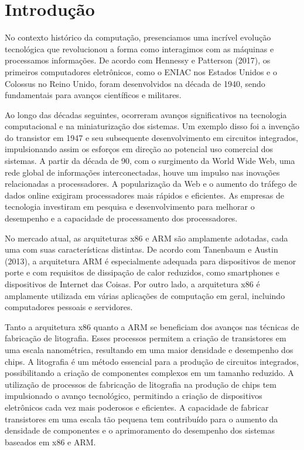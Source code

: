\section{Introdução}
\label{sec:introducao}

No contexto histórico da computação, presenciamos uma incrível evolução tecnológica que revolucionou a forma como interagimos com as máquinas e processamos informações. De acordo com Hennessy e Patterson (2017), os primeiros computadores eletrônicos, como o ENIAC nos Estados Unidos e o Colossus no Reino Unido, foram desenvolvidos na década de 1940, sendo fundamentais para avanços científicos e militares.

Ao longo das décadas seguintes, ocorreram avanços significativos na tecnologia computacional e na miniaturização dos sistemas. Um exemplo disso foi a invenção do transistor em 1947 e seu subsequente desenvolvimento em circuitos integrados, impulsionando assim os esforços em direção ao potencial uso comercial dos sistemas.
A partir da década de 90, com o surgimento da World Wide Web, uma rede global de informações interconectadas, houve um impulso nas inovações relacionadas a processadores. A popularização da Web e o aumento do tráfego de dados online exigiram processadores mais rápidos e eficientes. As empresas de tecnologia investiram em pesquisa e desenvolvimento para melhorar o desempenho e a capacidade de processamento dos processadores.

No mercado atual, as arquiteturas x86 e ARM são amplamente adotadas, cada uma com suas características distintas. De acordo com Tanenbaum e Austin (2013), a arquitetura ARM é especialmente adequada para dispositivos de menor porte e com requisitos de dissipação de calor reduzidos, como smartphones e dispositivos de Internet das Coisas. Por outro lado, a arquitetura x86 é amplamente utilizada em várias aplicações de computação em geral, incluindo computadores pessoais e servidores.

Tanto a arquitetura x86 quanto a ARM se beneficiam dos avanços nas técnicas de fabricação de litografia. Esses processos permitem a criação de transistores em uma escala nanométrica, resultando em uma maior densidade e desempenho dos chips. A litografia é um método essencial para a produção de circuitos integrados, possibilitando a criação de componentes complexos em um tamanho reduzido.
A utilização de processos de fabricação de litografia na produção de chips tem impulsionado o avanço tecnológico, permitindo a criação de dispositivos eletrônicos cada vez mais poderosos e eficientes. A capacidade de fabricar transistores em uma escala tão pequena tem contribuído para o aumento da densidade de componentes e o aprimoramento do desempenho dos sistemas baseados em x86 e ARM.



